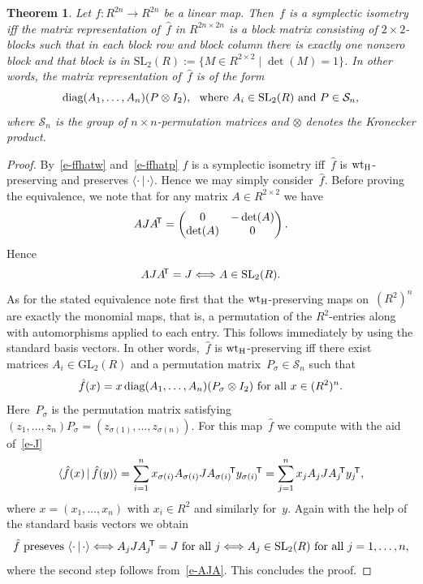 \documentclass[11pt]{article}
\newtheorem{theo}{Theorem}[section]
\theoremstyle{definition}
\numberwithin{equation}{section}
\newcommand{\cS}{{\mathcal S}}
\newcommand{\wtH}{\mbox{${\rm wt}_{\rm H}$}}
\newcommand{\T}{\mbox{$\!^{\sf T}$}}
\newcommand{\inner}[2]{\mbox{$\langle{#1}\,|\,{#2}\rangle$}}
\newcommand{\GL}{\mathrm{GL}}
\newcommand{\SL}{\mathrm{SL}}
\newcommand{\diag}{\textup{diag}}
\newcounter{rom}
\begin{document}
\begin{theo}\label{T-IsoR2n}
Let $f:R^{2n}\longrightarrow R^{2n}$ be a linear map.
Then~$f$ is a symplectic isometry iff the matrix representation of~$\hat{f}$ in $R^{2n\times 2n}$
is a block matrix consisting of $2\times2$-blocks such that in each block row and block column there is exactly one nonzero block and that block is in
$\SL_2(R):=\{M\in R^{2\times 2}\mid \det(M)=1\}$. In other words, the matrix representation of~$\hat{f}$ is of the form
\[
  \diag(A_1,\ldots,A_n)(P\otimes I_2),\ \text{ where }A_i\in\SL_2(R)\text{ and }P\in\cS_n,
\]
where $\cS_n$ is the group of $n\times n$-permutation matrices and $\otimes$ denotes the Kronecker product.
\end{theo}

\begin{proof}
By~\eqref{e-ffhatw} and~\eqref{e-ffhatp} $f$ is a symplectic isometry iff~$\hat{f}$ is $\wtH$-preserving and preserves
$\inner{\cdot}{\cdot}$. Hence we may simply consider~$\hat{f}$.
Before proving the equivalence, we note that for any matrix $A\in  R^{2\times 2}$ we have
\[
  AJA\T=\begin{pmatrix}0&-\det(A)\\\det(A)&0\end{pmatrix}.
\]
Hence
\begin{equation}\label{e-AJA}
  AJA\T=J\Longleftrightarrow A\in\SL_2(R).
\end{equation}
As for the stated equivalence note first that the $\wtH$-preserving maps on~$(R^2)^n$ are exactly the monomial maps, that is, a permutation of the 
$R^2$-entries along with automorphisms applied to each entry.
This follows immediately by using the standard basis vectors.
In other words,~$\hat{f}$ is $\wtH$-preserving iff there exist matrices $A_i\in\GL_2(R)$ and a
permutation matrix~$P_{\sigma}\in\cS_n$ such that
\[
  \hat{f}(x)=x\, \diag(A_1,\ldots,A_n)(P_{\sigma}\otimes I_2)\text{ for all }x\in(R^2)^n.
\]
Here~$P_{\sigma}$ is the permutation matrix  satisfying $(z_1,\ldots,z_n)P_\sigma=(z_{\sigma(1)},\ldots,z_{\sigma(n)})$.
For this map~$\hat{f}$ we compute with the aid of~\eqref{e-J}
\begin{equation}\label{e-fhatinner}
   \inner{\hat{f}(x)}{\hat{f}(y)}=\sum_{i=1}^n x_{\sigma(i)}A_{\sigma(i)}JA_{\sigma(i)}\T y_{\sigma(i)}\T=\sum_{j=1}^n x_jA_jJA_j\T y_j\T,
\end{equation}
where $x=(x_1,\ldots,x_n)$ with $x_i\in R^2$ and similarly for~$y$.
Again with the help of the standard basis vectors we obtain
\[
  \hat{f}\text{ preseves }\inner{\cdot}{\cdot}\Longleftrightarrow A_jJA_j\T=J\text{ for all }j\Longleftrightarrow A_j\in\SL_2(R)\text{ for all }j=1,\ldots,n,
\]
where the second step follows from~\eqref{e-AJA}.
This concludes the proof.
\end{proof}
\end{document}
